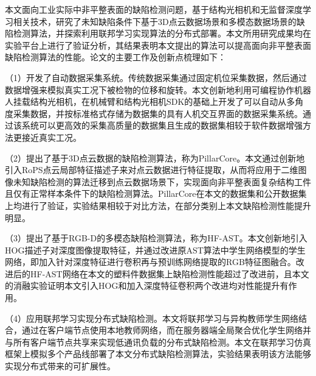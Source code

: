 %
%
%
%

\begin{conclusion}
    本文面向工业实际中非平整表面的缺陷检测问题，基于结构光相机和无监督深度学习相关技术，研究了未知缺陷条件下基于3D点云数据场景和多模态数据场景的缺陷检测算法，并探索利用联邦学习实现算法的分布式部署。本文所用研究成果均在实验平台上进行了验证分析，其结果表明本文提出的算法可以提高面向非平整表面缺陷检测算法的性能。论文的主要工作及创新点梳理如下：

    （1）开发了自动数据采集系统。传统数据采集通过固定机位采集数据，然后通过数据增强来模拟真实工况下被检物的位移和旋转。本文创新地利用可编程协作机器人挂载结构光相机，在机械臂和结构光相机SDK的基础上开发了可以自动从多角度采集数据，并按标准格式存储为数据集的具有人机交互界面的数据采集系统。通过该系统可以更高效的采集高质量的数据集且生成的数据集相较于软件数据增强方法更接近真实工况。
    
    （2）提出了基于3D点云数据的缺陷检测算法，称为PillarCore。本文通过创新地引入RoPS点云局部特征描述子来对点云数据进行特征提取，从而将应用于二维图像未知缺陷检测的算法迁移到点云数据场景下，实现面向非平整表面复杂结构工件且仅有正常样本条件下的缺陷检测算法。PillarCore在本文的数据集和公开数据集上均进行了验证，实验结果相较于对比方法，在部分类别上本文缺陷检测性能提升明显。
    
    （3）提出了基于RGB-D的多模态缺陷检测算法，称为HF-AST。本文创新地引入HOG描述子对深度图像提取特征，并通过改进原AST算法中学生网络模型的学生网络，即加入针对深度特征进行卷积再与预训练网络提取的RGB特征图融合。改进后的HF-AST网络在本文的塑料件数据集上缺陷检测性能超过了改进前，且本文的消融实验证明本文引入HOG和加入深度特征卷积两个改进均对性能提升有作用。
    
    （4）应用联邦学习实现分布式缺陷检测。本文将联邦学习与异构教师学生网络结合，通过在客户端节点使用本地教师网络，而在服务器端全局聚合优化学生网络并与所有客户端节点共享来实现低通讯负载的分布式缺陷检测。本文在联邦学习仿真框架上模拟多个产品线部署了本文分布式缺陷检测算法，实验结果表明该方法能够实现分布式带来的可扩展性。
    

\end{conclusion}

